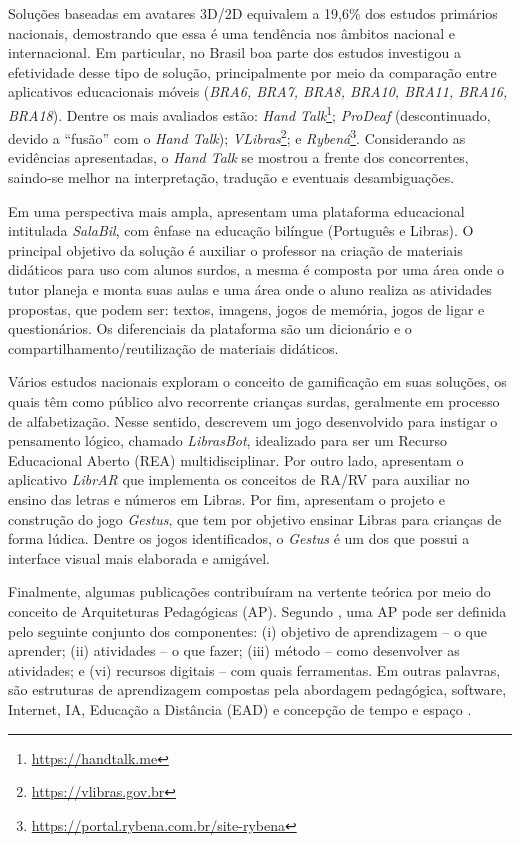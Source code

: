 Soluções baseadas em avatares 3D/2D equivalem a 19,6\% dos estudos primários nacionais, demostrando que essa é uma tendência nos âmbitos nacional e internacional. Em particular, no Brasil boa parte dos estudos investigou a efetividade desse tipo de solução, principalmente por meio da comparação entre aplicativos educacionais móveis (\textit{BRA6, BRA7, BRA8, BRA10, BRA11, BRA16, BRA18}). Dentre os mais avaliados estão: \textit{Hand Talk}\footnote{\url{https://handtalk.me}}; \textit{ProDeaf} (descontinuado, devido a ``fusão'' com o \textit{Hand Talk}); \textit{VLibras}\footnote{\url{https://vlibras.gov.br}}; e \textit{Rybená}\footnote{\url{https://portal.rybena.com.br/site-rybena}}. Considerando as evidências apresentadas, o \textit{Hand Talk} se mostrou a frente dos concorrentes, saindo-se melhor na interpretação, tradução e eventuais desambiguações.

Em uma perspectiva mais ampla,  apresentam uma plataforma educacional intitulada \textit{SalaBil}, com ênfase na educação bilíngue (Português e Libras). O principal objetivo da solução é auxiliar o professor na criação de materiais didáticos para uso com alunos surdos, a mesma é composta por uma área onde o tutor planeja e monta suas aulas e uma área onde o aluno realiza as atividades propostas, que podem ser: textos, imagens, jogos de memória, jogos de ligar e questionários. Os diferenciais da plataforma são um dicionário e o compartilhamento/reutilização de materiais didáticos.

Vários estudos nacionais exploram o conceito de gamificação em suas soluções, os quais têm como público alvo recorrente crianças surdas, geralmente em processo de alfabetização. Nesse sentido, \cite{BRA23} descrevem um jogo desenvolvido para instigar o pensamento lógico, chamado \textit{LibrasBot}, idealizado para ser um Recurso Educacional Aberto (REA) multidisciplinar. Por outro lado,  apresentam o aplicativo \textit{LibrAR} que implementa os conceitos de RA/RV para auxiliar no ensino das letras e números em Libras. Por fim,  apresentam o projeto e construção do jogo \textit{Gestus}, que tem por objetivo ensinar Libras para crianças de forma lúdica. Dentre os jogos identificados, o \textit{Gestus} é um dos que possui a interface visual mais elaborada e amigável.

Finalmente, algumas publicações contribuíram na vertente teórica por meio do conceito de Arquiteturas Pedagógicas (AP). Segundo , uma AP pode ser definida pelo seguinte conjunto dos componentes: (i) objetivo de aprendizagem -- o que aprender; (ii) atividades -- o que fazer; (iii) método -- como desenvolver as atividades; e (vi) recursos digitais -- com quais ferramentas. Em outras palavras, são estruturas de aprendizagem compostas pela abordagem pedagógica, software, Internet, IA, Educação a Distância (EAD) e concepção de tempo e espaço \cite{BRA27}.

